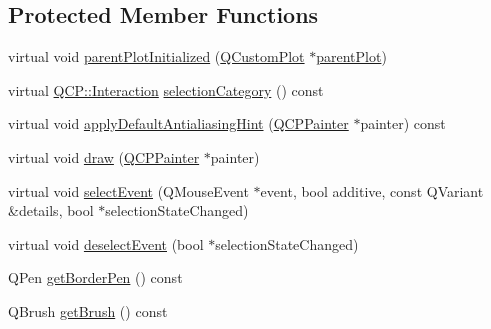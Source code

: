 \subsection*{Protected Member Functions}
\begin{DoxyCompactItemize}
\item 
virtual void \hyperlink{class_q_c_p_legend_a4d552c63d82742d77fb7f177bae7b1ba}{parent\+Plot\+Initialized} (\hyperlink{class_q_custom_plot}{Q\+Custom\+Plot} $\ast$\hyperlink{class_q_c_p_layerable_ab7e0e94461566093d36ffc0f5312b109}{parent\+Plot})
\item 
virtual \hyperlink{namespace_q_c_p_a2ad6bb6281c7c2d593d4277b44c2b037}{Q\+C\+P\+::\+Interaction} \hyperlink{class_q_c_p_legend_a7a9795a28c9c2514b4ae50f0a63d407c}{selection\+Category} () const 
\item 
virtual void \hyperlink{class_q_c_p_legend_a26307f532c3458b379663b7d517a5f47}{apply\+Default\+Antialiasing\+Hint} (\hyperlink{class_q_c_p_painter}{Q\+C\+P\+Painter} $\ast$painter) const 
\item 
virtual void \hyperlink{class_q_c_p_legend_a4462151bf875ca85fa3815457c683fdc}{draw} (\hyperlink{class_q_c_p_painter}{Q\+C\+P\+Painter} $\ast$painter)
\item 
virtual void \hyperlink{class_q_c_p_legend_af93bf87dc5c383a9d2ada80b35f3a1a5}{select\+Event} (Q\+Mouse\+Event $\ast$event, bool additive, const Q\+Variant \&details, bool $\ast$selection\+State\+Changed)
\item 
virtual void \hyperlink{class_q_c_p_legend_a5208ead4331c9b0440f768f059777c58}{deselect\+Event} (bool $\ast$selection\+State\+Changed)
\item 
Q\+Pen \hyperlink{class_q_c_p_legend_a60172c9d2212584f38f5d0c1e50970c7}{get\+Border\+Pen} () const 
\item 
Q\+Brush \hyperlink{class_q_c_p_legend_a236fe4cd617c9f88620fd9de74417f20}{get\+Brush} () const 
\end{DoxyCompactItemize}
